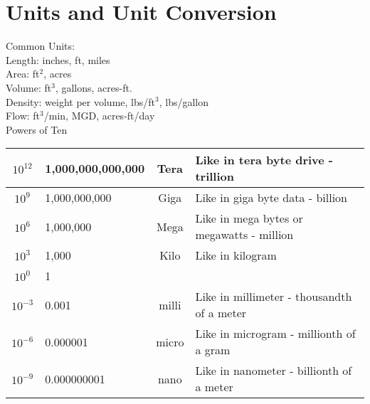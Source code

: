 \section{Units and Unit Conversion}

Common Units:\\

Length:  inches, ft, miles\\

Area:  ft$^2$, acres \\

Volume:  ft$^3$, gallons, acres-ft.\\

Density:  weight per volume, lbs/ft$^3$, lbs/gallon\\

Flow:  ft$^3$/min, MGD, acres-ft/day\\

		


Powers of Ten

\begin{center}
    
   
    \begin{tabular}{ | c | p{4cm} | c |p{8cm}|}
    \hline


$10^{12}$ & 1,000,000,000,000 & Tera & Like in tera byte drive - trillion\\
\hline 
$10^{9}$ & 1,000,000,000 & Giga & Like in giga byte data - billion\\
\hline
$10^{6}$ & 1,000,000 & Mega & Like in mega bytes or megawatts - million\\
\hline 
$10^{3}$ & 1,000 & Kilo & Like in kilogram \\
\hline 
$10^{0}$ & 1 &  & \\
\hline 
$10^{-3}$ & 0.001 & milli & Like in millimeter - thousandth of a meter\\
\hline 
$10^{-6}$ & 0.000001 & micro & Like in microgram - millionth of a gram \\
\hline 
$10^{-9}$ & 0.000000001 & nano & Like in nanometer - billionth of a meter\\
\hline 


    \end{tabular}
    
    \end{center}


